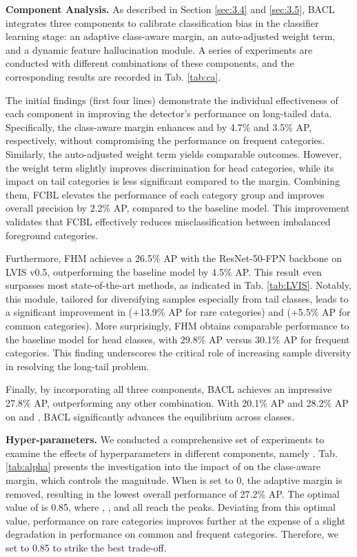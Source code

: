\documentclass[lettersize,journal]{IEEEtran}
\begin{document}
\noindent\textbf{Component Analysis.}
As described in Section \ref{sec:3.4} and \ref{sec:3.5}, BACL integrates three components to calibrate classification bias in the classifier learning stage: an adaptive class-aware margin, an auto-adjusted weight term, and a dynamic feature hallucination module.
A series of experiments are conducted with different combinations of these components, and the corresponding results are recorded in Tab. \ref{tab:ca}.

The initial findings (first four lines) demonstrate the individual effectiveness of each component in improving the detector's performance on long-tailed data.
Specifically, the class-aware margin enhances  and  by 4.7\% and 3.5\% AP, respectively, without compromising the performance on frequent categories.
Similarly, the auto-adjusted weight term yields comparable outcomes.
However, the weight term slightly improves discrimination for head categories, while its impact on tail categories is less significant compared to the margin.
Combining them, FCBL elevates the performance of each category group and improves overall precision by 2.2\% AP, compared to the baseline model.
This improvement validates that FCBL effectively reduces misclassification between imbalanced foreground categories.

Furthermore, FHM achieves a 26.5\% AP with the ResNet-50-FPN backbone on LVIS v0.5, outperforming the baseline model by 4.5\% AP.
This result even surpasses most state-of-the-art methods, as indicated in Tab. \ref{tab:LVIS}.
Notably, this module, tailored for diversifying samples especially from tail classes, leads to a significant improvement in  (+13.9\% AP for rare categories) and  (+5.5\% AP for common categories).
More surprisingly, FHM obtains comparable performance to the baseline model for head classes, with 29.8\% AP versus 30.1\% AP for frequent categories.
This finding underscores the critical role of increasing sample diversity in resolving the long-tail problem.

Finally, by incorporating all three components, BACL achieves an impressive 27.8\% AP, outperforming any other combination.
With 20.1\% AP and 28.2\% AP on  and , BACL significantly advances the equilibrium across classes.


\noindent\textbf{Hyper-parameters.}
We conducted a comprehensive set of experiments to examine the effects of hyperparameters in different components, namely .
Tab. \ref{tab:alpha} presents the investigation into the impact of  on the class-aware margin, which controls the magnitude.
When  is set to 0, the adaptive margin is removed, resulting in the lowest overall performance of 27.2\% AP.
The optimal value of  is 0.85, where , , and  all reach the peaks.
Deviating from this optimal value, performance on rare categories improves further at the expense of a slight degradation in performance on common and frequent categories.
Therefore, we set  to 0.85 to strike the best trade-off.
\end{document}
